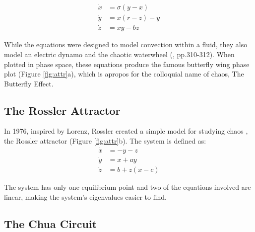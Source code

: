           \begin{equation}\label{eq:lorenz}
              \begin{align}
                  \dot{x}&=\sigma(y-x)\\
                  \dot{y}&=x(r-z)-y\\
                  \dot{z}&=xy-bz
              \end{align}
          \end{equation}

          While the equations were designed to model convection
          within a fluid, they also model an electric dynamo \cite{item:11} and the chaotic waterwheel \cite{item:11}(\cite{item:2}, pp.310-312).
          When plotted in phase space, these equations produce the famous butterfly wing phase plot (Figure \ref{fig:attr}a),
          which is apropos for the colloquial name of chaos, The Butterfly Effect.\\

        \subsection{The Rossler Attractor}

          In 1976, inspired by Lorenz, Rossler created a
          simple model for studying chaos \cite{item:12}, the Rossler attractor (Figure \ref{fig:attr}b). The system is defined as:
          \begin{equation}\label{eq:rossler}
              \begin{align}
                  \dot{x}&=-y-z\\
                  \dot{y}&=x+ay\\
                  \dot{z}&=b+z(x-c)
              \end{align}
          \end{equation}

          The system has only one equilibrium point and two of the equations involved are linear, making the system's eigenvalues
          easier to find.\\

    \subsection{The Chua Circuit}

